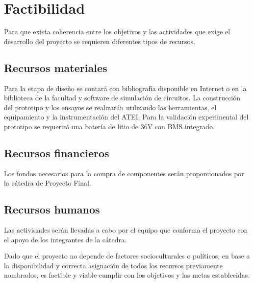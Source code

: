 \section{Factibilidad}

Para que exista coherencia entre los objetivos y las actividades que exige el desarrollo del proyecto se requieren diferentes tipos de recursos. 

\subsection{Recursos materiales}
Para la etapa de diseño se contará con bibliografía disponible en Internet o en la biblioteca de la facultad y software de simulación de circuitos.
La construcción del prototipo y los ensayos se realizarán utilizando las herramientas, el equipamiento y la instrumentación del ATEI. 
Para la validación experimental del prototipo se requerirá una batería de litio de 36V con BMS integrado. 

\subsection{Recursos financieros}
Los fondos necesarios para la compra de componentes serán proporcionados por la cátedra de Proyecto Final.

\subsection{Recursos humanos}
Las actividades serán llevadas a cabo por el equipo que conforma el proyecto con el apoyo de los integrantes de la cátedra.

Dado que el proyecto no depende de factores socioculturales o políticos, en base a la disponibilidad y correcta asignación
de todos los recursos previamente nombrados, es factible y viable cumplir con los objetivos y las metas establecidas. 